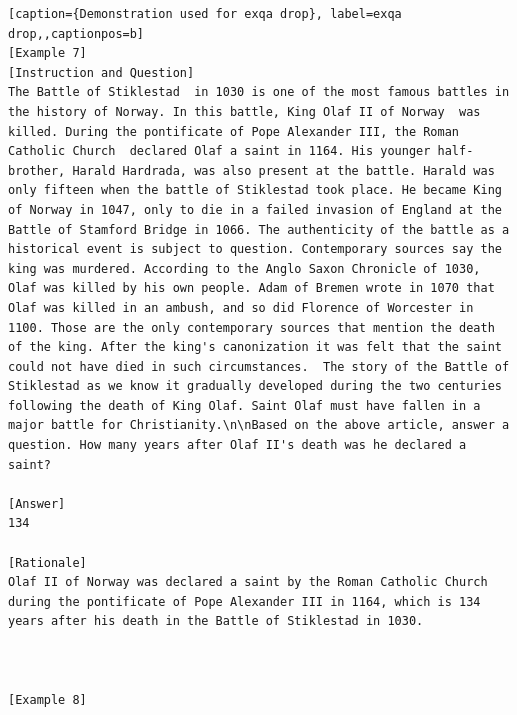 \begin{lstlisting}[caption={Demonstration used for exqa drop}, label=exqa drop,,captionpos=b]
[Example 7]
[Instruction and Question]
The Battle of Stiklestad  in 1030 is one of the most famous battles in the history of Norway. In this battle, King Olaf II of Norway  was killed. During the pontificate of Pope Alexander III, the Roman Catholic Church  declared Olaf a saint in 1164. His younger half-brother, Harald Hardrada, was also present at the battle. Harald was only fifteen when the battle of Stiklestad took place. He became King of Norway in 1047, only to die in a failed invasion of England at the Battle of Stamford Bridge in 1066. The authenticity of the battle as a historical event is subject to question. Contemporary sources say the king was murdered. According to the Anglo Saxon Chronicle of 1030, Olaf was killed by his own people. Adam of Bremen wrote in 1070 that Olaf was killed in an ambush, and so did Florence of Worcester in 1100. Those are the only contemporary sources that mention the death of the king. After the king's canonization it was felt that the saint could not have died in such circumstances.  The story of the Battle of Stiklestad as we know it gradually developed during the two centuries following the death of King Olaf. Saint Olaf must have fallen in a major battle for Christianity.\n\nBased on the above article, answer a question. How many years after Olaf II's death was he declared a saint?

[Answer]
134

[Rationale]
Olaf II of Norway was declared a saint by the Roman Catholic Church during the pontificate of Pope Alexander III in 1164, which is 134 years after his death in the Battle of Stiklestad in 1030.



[Example 8]
    \end{lstlisting}
    





